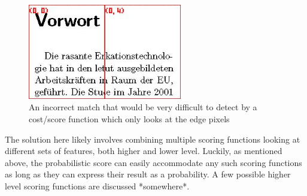 \begin{figure}[h]
\centering
\includegraphics[width=0.6\textwidth]{conf}
\caption{An incorrect match that would be very difficult to detect by a cost/score function which only looks at the edge pixels}
\label{fig:fakeMatch}
\end{figure}

The solution here likely involves combining multiple scoring functions looking at different sets of features, both higher and lower level. Luckily, as mentioned above, the probabilistic score can easily accommodate any such scoring functions as long as they can express their result as a probability. A few possible higher level scoring functions are discussed *somewhere*. 

